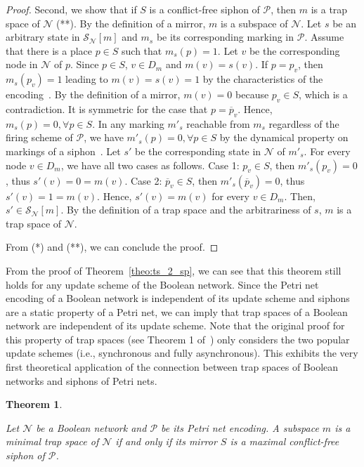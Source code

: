 \documentclass[preprint,12pt]{elsarticle}
\newtheorem{theorem}{Theorem}[section]
\begin{document}
\begin{proof}
  Second, we show that if \(S\) is a conflict-free siphon of \(\mathcal{P}\), then \(m\) is a trap space of \(\mathcal{N}\) (**). 
  By the definition of a mirror, \(m\) is a subspace of \(\mathcal{N}\). 
  Let \(s\) be an arbitrary state in \(\mathcal{S}_{\mathcal{N}}[m]\) and \(m_s\) be its corresponding marking in \(\mathcal{P}\).
  Assume that there is a place \(p \in S\) such that \(m_s(p) = 1\).
  Let \(v\) be the corresponding node in \(\mathcal{N}\) of \(p\).
  Since \(p \in S\), \(v \in D_m\) and \(m(v) = s(v)\).
  If \(p = p_{v}\), then \(m_s(p_{v}) = 1\) leading to \(m(v) = s(v) = 1\) by the characteristics of the encoding~\cite{chaouiya2004qualitative}.
  By the definition of a mirror, \(m(v) = 0\) because \(p_{v} \in S\), which is a contradiction.
  It is symmetric for the case that \(p = \overline{p}_{v}\).
  Hence, \(m_s(p) = 0, \forall p \in S\).
  In any marking \(m'_s\) reachable from \(m_s\) regardless of the firing scheme of \(\mathcal{P}\), we have \(m'_s(p) = 0, \forall p \in S\) by the dynamical property on markings of a siphon~\cite{DBLP:journals/isci/LiuB16}.
  Let \(s'\) be the corresponding state in \(\mathcal{N}\) of \(m'_s\).
  For every node \(v \in D_m\), we have all two cases as follows.
  Case 1: \(p_v \in S\), then \(m'_s(p_v) = 0\), thus \(s'(v) = 0 = m(v)\).
  Case 2: \(\overline{p}_v \in S\), then \(m'_s(\overline{p}_v) = 0\), thus \(s'(v) = 1 = m(v)\).
  Hence, \(s'(v) = m(v)\) for every \(v \in D_m\).
  Then, \(s' \in \mathcal{S}_{\mathcal{N}}[m]\).
  By the definition of a trap space and the arbitrariness of \(s\), \(m\) is a trap space of \(\mathcal{N}\).

  From (*) and (**), we can conclude the proof.
\end{proof}

From the proof of Theorem~\ref{theo:ts_2_sp}, we can see that this theorem still holds for any update scheme of the Boolean network.
Since the Petri net encoding of a Boolean network is independent of its update scheme and siphons are a static property of a Petri net, we can imply that trap spaces of a Boolean network are independent of its update scheme.
Note that the original proof for this property of trap spaces (see Theorem 1 of~\cite{klarner2015computing}) only considers the two popular update schemes (i.e., synchronous and fully asynchronous).
This exhibits the very first theoretical application of the connection between trap spaces of Boolean networks and siphons of Petri nets.

\begin{theorem}%
\label{theo:min_ts_2_max_sp}

  Let \(\mathcal{N}\) be a Boolean network and \(\mathcal{P}\) be its Petri net encoding. A subspace \(m\) is a minimal trap space of \(\mathcal{N}\) if and only if its mirror \(S\) is a maximal conflict-free siphon of \(\mathcal{P}\).

\end{theorem}
\end{document}
